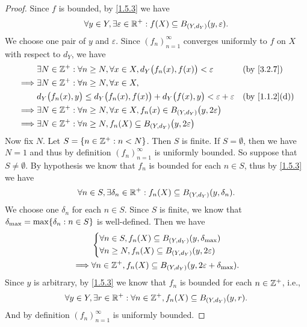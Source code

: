 \begin{proof}
  Since \(f\) is bounded, by \cref{1.5.3} we have
  \[
    \forall y \in Y, \exists \varepsilon \in \mathbb{R}^+ : f(X) \subseteq B_{(Y, d_Y)}(y, \varepsilon).
  \]
  We choose one pair of \(y\) and \(\varepsilon\).
  Since \((f_n)_{n = 1}^\infty\) converges uniformly to \(f\) on \(X\) with respect to \(d_Y\), we have
  \begin{align*}
             & \exists N \in \Z^+ : \forall n \geq N, \forall x \in X, d_Y\big(f_n(x), f(x)\big) < \varepsilon          &  & \by{3.2.7}                  \\
    \implies & \exists N \in \Z^+ : \forall n \geq N, \forall x \in X,                                                                                   \\
             & d_Y\big(f_n(x), y\big) \leq d_Y\big(f_n(x), f(x)\big) + d_Y\big(f(x), y\big) < \varepsilon + \varepsilon &  & \text{(by \cref{1.1.2}(d))} \\
    \implies & \exists N \in \Z^+ : \forall n \geq N, \forall x \in X, f_n(x) \in B_{(Y, d_Y)}\big(y, 2\varepsilon\big)                                  \\
    \implies & \exists N \in \Z^+ : \forall n \geq N, f_n(X) \subseteq B_{(Y, d_Y)}\big(y, 2\varepsilon\big)
  \end{align*}
  Now fix \(N\).
  Let \(S = \left\lbrace n \in \mathbb{Z}^+ : n < N\right\rbrace\).
  Then \(S\) is finite.
  If \(S = \emptyset\), then we have \(N = 1\) and thus by definition \((f_n)_{n = 1}^\infty\) is uniformly bounded.
  So suppose that \(S \neq \emptyset\).
  By hypothesis we know that \(f_n\) is bounded for each \(n \in S\), thus by \cref{1.5.3} we have
  \[
    \forall n \in S, \exists \delta_n \in \mathbb{R}^+ : f_n(X) \subseteq B_{(Y, d_Y)}(y, \delta_n).
  \]
  We choose one \(\delta_n\) for each \(n \in S\).
  Since \(S\) is finite, we know that \(\delta_{\max} = \max\set{\delta_n : n \in S}\) is well-defined.
  Then we have
  \begin{align*}
             & \begin{dcases}
                 \forall n \in S, f_n(X) \subseteq B_{(Y, d_Y)}(y, \delta_{\max}) \\
                 \forall n \geq N, f_n(X) \subseteq B_{(Y, d_Y)}(y, 2\varepsilon)
               \end{dcases}                    \\
    \implies & \forall n \in \mathbb{Z}^+, f_n(X) \subseteq B_{(Y, d_Y)}(y, 2\varepsilon + \delta_{\max}).
  \end{align*}
  Since \(y\) is arbitrary, by \cref{1.5.3} we know that \(f_n\) is bounded for each \(n \in \mathbb{Z}^+\), i.e.,
  \[
    \forall y \in Y, \exists r \in \mathbb{R}^+ : \forall n \in \mathbb{Z}^+, f_n(X) \subseteq B_{(Y, d_Y)}(y, r).
  \]
  And by definition \((f_n)_{n = 1}^\infty\) is uniformly bounded.
\end{proof}

